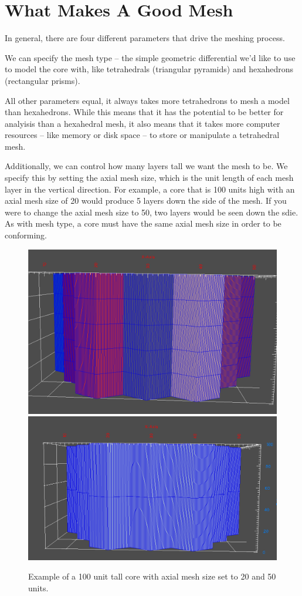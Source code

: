 \section{What Makes A Good Mesh}

In general, there are four different parameters that drive the meshing process.

We can specify the mesh type -- the simple geometric differential we'd like to use to model the core with, like tetrahedrals (triangular pyramids) and hexahedrons (rectangular prisms).

\begin{didyouknow}
All other parameters equal, it always takes more tetrahedrons to mesh a model than hexahedrons.  While this means that it has the potential to be better for analyisis than a hexahedral mesh, it also means that it takes more computer resources -- like memory or disk space -- to store or manipulate a tetrahedral mesh.
\end{didyouknow}

Additionally, we can control how many layers tall we want the mesh to be.  We specify this by setting the axial mesh size, which is the unit length of each mesh layer in the vertical direction.  For example, a core that is 100 units high with an axial mesh size of 20 would produce 5 layers down the side of the mesh.  If you were to change the axial mesh size to 50, two layers would be seen down the sdie.  As with mesh type, a core must have the same axial mesh size in order to be conforming.

\begin{figure}[H]
	\begin{center}
		\includegraphics[width=0.5\linewidth]{Images/axial-mesh-20.png}
		\includegraphics[width=0.5\linewidth]{Images/axial-mesh-50.png}

		\caption{Example of a 100 unit tall core with axial mesh size set to 20 and 50 units.}
		\label{fig:AxialMesh}
	\end{center}
\end{figure}

